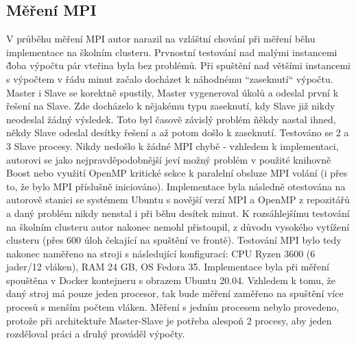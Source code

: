 \documentclass{article}%
\begin{document}
\subsection{Měření MPI}
V průběhu měření MPI autor narazil na vzláštní chování při měření běhu implementace na školním clusteru. Prvnostní testování nad malými instancemi \~ doba výpočtu pár vteřina byla bez problémů. Při spuštění nad většími instancemi s výpočtem v řádu minut začalo docházet k náhodnému ``zaseknutí`` výpočtu. Master i Slave se korektně spustily, Master vygeneroval úkolů a odeslal první k řešení na Slave. Zde docházelo k nějakému typu zaseknutí, kdy Slave již nikdy neodeslal žádný výsledek. Toto byl časově závislý problém \~ někdy nastal ihned, někdy Slave odeslal desítky řešení a až potom došlo k zaseknutí. Testováno se 2 a 3 Slave procesy. Nikdy nedošlo k žádné MPI chybě - vzhledem k implementaci, autorovi se jako nejpravděpodobnější jeví možný problém v použité knihovně Boost nebo využití OpenMP kritické sekce k paralelní obsluze MPI volání (i přes to, že bylo MPI příslušně iniciováno). Implementace byla následně otestována na autorově stanici se systémem Ubuntu s novější verzí MPI a OpenMP z repozitářů a daný problém nikdy nenstal i při běhu desítek minut. K rozsáhlejšímu testování na školním clusteru autor nakonec nemohl přistoupil, z důvodu vysokého vytížení clusteru (přes 600 úloh čekající na spuštění ve frontě). Testování MPI bylo tedy nakonec naměřeno na stroji s následující konfigurací: CPU Ryzen 3600 (6 jader/12 vláken), RAM 24 GB, OS Fedora 35. Implementace byla při měření spouštěna v Docker kontejneru s obrazem Ubuntu 20.04. Vzhledem k tomu, že daný stroj má pouze jeden procesor, tak bude měření zaměřeno na spuštění více procesů s menším počtem vláken. Měření s jedním procesem nebylo provedeno, protože při architektuře Master-Slave je potřeba alespoň 2 procesy, aby jeden rozděloval práci a druhý prováděl výpočty.
\end{document}
